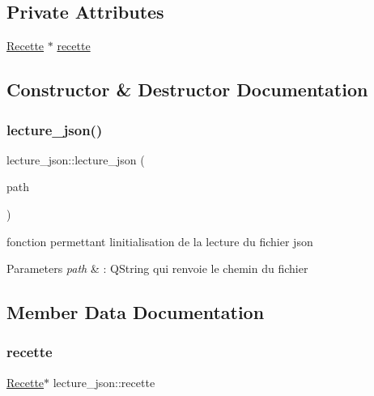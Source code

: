\subsection*{Private Attributes}
\begin{DoxyCompactItemize}
\item 
\hyperlink{classRecette}{Recette} $\ast$ \hyperlink{classlecture__json_a5d82d4ff42d4c8e3162428c4fa7f6f6a}{recette}
\end{DoxyCompactItemize}


\subsection{Constructor \& Destructor Documentation}
\mbox{\label{classlecture__json_aa20851b2c129e7edad98c77302201ae1}} 
\subsubsection{\texorpdfstring{lecture\+\_\+json()}{lecture\_json()}}
{\footnotesize\ttfamily lecture\+\_\+json\+::lecture\+\_\+json (\begin{DoxyParamCaption}\item[{Q\+String}]{path }\end{DoxyParamCaption})}



fonction permettant l\textquotesingle{}initialisation de la lecture du fichier json 


\begin{DoxyParams}{Parameters}
{\em path} & \+: Q\+String qui renvoie le chemin du fichier \\
\hline
\end{DoxyParams}


\subsection{Member Data Documentation}
\mbox{\label{classlecture__json_a5d82d4ff42d4c8e3162428c4fa7f6f6a}} 
\subsubsection{\texorpdfstring{recette}{recette}}
{\footnotesize\ttfamily \hyperlink{classRecette}{Recette}$\ast$ lecture\+\_\+json\+::recette\hspace{0.3cm}{\ttfamily [private]}}

